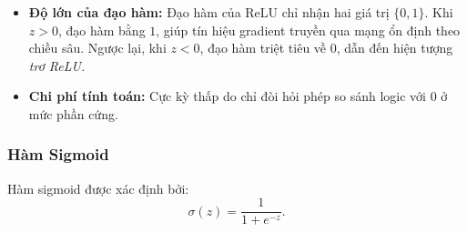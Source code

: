 \begin{itemize}
\begin{itemize}
    \item \emph{Hệ quả tính toán:} Tính chất $\operatorname{ReLU}''(z) = 0$ hầu khắp nơi dẫn đến các hệ quả trong tối ưu hóa và học máy khoa học, chẳng hạn:
Cơ chế vi phân tự động trong mạng nơ-ron sử dùng hàm ReLU sẽ tính ra đạo hàm bậc hai bằng không hầu khắp nơi. Do đó, mạng nơ-ron sâu dùng thuần hàm kích hoạt ReLU không thể mô hình hóa số hạng vi phân cấp hai (chẳng hạn như toán tử khuếch tán $\Delta u$) trong các phương trình đạo hàm riêng (PDEs), các phương pháp PINNs.
\end{itemize}
    \item \textbf{Độ lớn của đạo hàm:} Đạo hàm của ReLU chỉ nhận hai giá trị $\{0, 1\}$. Khi $z > 0$, đạo hàm bằng $1$, giúp tín hiệu gradient truyền qua mạng ổn định theo chiều sâu. Ngược lại, khi $z < 0$, đạo hàm triệt tiêu về $0$, dẫn đến hiện tượng \textit{trơ ReLU.}

    \item \textbf{Chi phí tính toán:} Cực kỳ thấp do chỉ đòi hỏi phép so sánh logic với $0$ ở mức phần cứng.
\end{itemize}

\subsubsection{Hàm Sigmoid}
Hàm sigmoid được xác định bởi:
\begin{equation}
\sigma(z) = \frac{1}{1 + e^{-z}}.
\end{equation}


